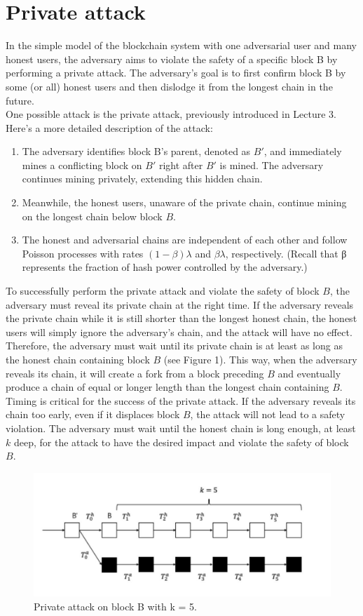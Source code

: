 \section{Private attack}
In the simple model of the blockchain system with one adversarial user and many honest users, the adversary aims to violate the safety of a specific block B by performing a private attack. The adversary's goal is to first confirm block B by some (or all) honest users and then dislodge it from the longest chain in the future.\\
One possible attack is the private attack, previously introduced in Lecture 3. Here's a more detailed description of the attack:
\begin{enumerate}
	\item The adversary identifies block B's parent, denoted as $B′$, and immediately mines a conflicting block on $B′$ right after $B′$ is mined. The adversary continues mining privately, extending this hidden chain. 
	\item Meanwhile, the honest users, unaware of the private chain, continue mining on the longest chain below block $B$.
	\item The honest and adversarial chains are independent of each other and follow Poisson processes with rates $(1 − \beta)\lambda$ and $\beta\lambda$, respectively. (Recall that β represents the fraction of hash power controlled by the adversary.)
\end{enumerate}
To successfully perform the private attack and violate the safety of block $B$, the adversary must reveal its private chain at the right time. If the adversary reveals the private chain while it is still shorter than the longest honest chain, the honest users will simply ignore the adversary's chain, and the attack will have no effect.\\
Therefore, the adversary must wait until its private chain is at least as long as the honest chain containing block $B$ (see Figure 1). This way, when the adversary reveals its chain, it will create a fork from a block preceding $B$ and eventually produce a chain of equal or longer length than the longest chain containing $B$.\\
Timing is critical for the success of the private attack. If the adversary reveals its chain too early, even if it displaces block $B$, the attack will not lead to a safety violation. The adversary must wait until the honest chain is long enough, at least $k$ deep, for the attack to have the desired impact and violate the safety of block $B$. 
\begin{figure}[h!]
	\centering
	\includegraphics[width=0.6\linewidth]{Fig/06/F1}
	\caption{Private attack on block B with k = 5.}
	\label{fig:f1}
\end{figure}
